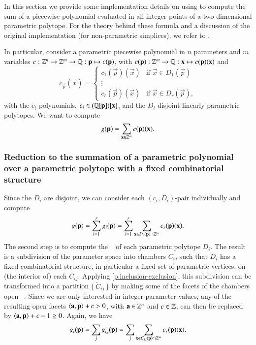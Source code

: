 In this section we provide some implementation details
on using  to compute
the sum of a piecewise polynomial evaluated in all integer
points of a two-dimensional parametric polytope.
For the theory behind these formula and a discussion
of the original implementation (for non-parametric simplices),
we refer to .

In particular, consider a parametric piecewise polynomial
in $n$ parameters and $m$ variables
$c : \ZZ^n \to \ZZ^m \to \QQ : \vec p \mapsto c(\vec p)$,
with $c(\vec p) : \ZZ^m \to \QQ : \vec x \mapsto c(\vec p)(\vec x)$
and
$$
c_{\vec p}(\vec x) =
\begin{cases}
c_1(\vec p)(\vec x) & \text{if $\vec x \in D_1(\vec p)$}
\\
\vdots
\\
c_r(\vec p)(\vec x) & \text{if $\vec x \in D_r(\vec p)$}
,
\end{cases}
$$
with the $c_i$ polynomials, $c_i \in (\QQ[\vec p])[\vec x]$, and 
the $D_i$ disjoint linearly parametric polytopes.
We want to compute
$$
g(\vec p) = \sum_{\vec x \in \ZZ^m} c(\vec p)(\vec x)
.
$$

\subsubsection{Reduction to the summation of a parametric polynomial
over a parametric polytope with a fixed combinatorial structure}

Since the $D_i$ are disjoint, we can consider each
$(c_i, D_i)$-pair individually and compute
$$
g(\vec p) = \sum_{i=1}^r g_i(\vec p) =
\sum_{i=1}^r \sum_{\vec x \in D_r(\vec p) \cap \ZZ^m} c_r(\vec p)(\vec x)
.
$$
The second step is to compute the 
~ of each parametric
polytope $D_i$.
The result is a subdivision of the parameter space into chambers
$C_{ij}$ such that $D_i$ has a fixed combinatorial structure,
in particular a fixed set of parametric vertices,
on (the interior of) each $C_{ij}$.  Applying \autoref{p:inclusion-exclusion},
this subdivision can be transformed into a partition
$\{\, \tilde C_{ij} \,\}$ by
making some of the facets of the chambers open%
~.
Since we are only interested in integer parameter values,
any of the resulting open facets $\sp a p + c > 0$,
with $\vec a \in \ZZ^n$ and $c \in \mathbb{Z}$,
can then be replaced by  $\sp a p + c-1 \ge 0$.
Again, we have
$$
g_i(\vec p) = \sum_j g_{ij}(\vec p) =
\sum_j \sum_{\vec x \in C_{ij}(\vec p) \cap \ZZ^m} c_r(\vec p)(\vec x)
.
$$

